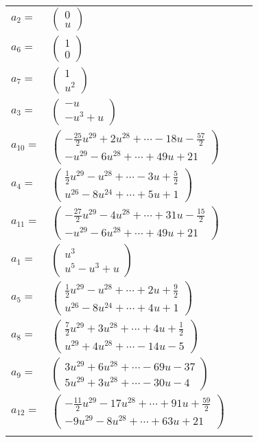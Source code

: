 \documentclass[1p]{elsarticle_modified}
\theoremstyle{definition}
\begin{document}
\begin{tabular}{m{7pt} m{180pt} m{7pt} m{180pt} }
\flushright $a_{2}=$&$\begin{pmatrix}0\\u\end{pmatrix}$ \\
\flushright $a_{6}=$&$\begin{pmatrix}1\\0\end{pmatrix}$ \\
\flushright $a_{7}=$&$\begin{pmatrix}1\\u^2\end{pmatrix}$ \\
\flushright $a_{3}=$&$\begin{pmatrix}- u\\- u^3+u\end{pmatrix}$ \\
\flushright $a_{10}=$&$\begin{pmatrix}-\frac{25}{2} u^{29}+2 u^{28}+\cdots-18 u-\frac{57}{2}\\- u^{29}-6 u^{28}+\cdots+49 u+21\end{pmatrix}$ \\
\flushright $a_{4}=$&$\begin{pmatrix}\frac{1}{2} u^{29}- u^{28}+\cdots-3 u+\frac{5}{2}\\u^{26}-8 u^{24}+\cdots+5 u+1\end{pmatrix}$ \\
\flushright $a_{11}=$&$\begin{pmatrix}-\frac{27}{2} u^{29}-4 u^{28}+\cdots+31 u-\frac{15}{2}\\- u^{29}-6 u^{28}+\cdots+49 u+21\end{pmatrix}$ \\
\flushright $a_{1}=$&$\begin{pmatrix}u^3\\u^5- u^3+u\end{pmatrix}$ \\
\flushright $a_{5}=$&$\begin{pmatrix}\frac{1}{2} u^{29}- u^{28}+\cdots+2 u+\frac{9}{2}\\u^{26}-8 u^{24}+\cdots+4 u+1\end{pmatrix}$ \\
\flushright $a_{8}=$&$\begin{pmatrix}\frac{7}{2} u^{29}+3 u^{28}+\cdots+4 u+\frac{1}{2}\\u^{29}+4 u^{28}+\cdots-14 u-5\end{pmatrix}$ \\
\flushright $a_{9}=$&$\begin{pmatrix}3 u^{29}+6 u^{28}+\cdots-69 u-37\\5 u^{29}+3 u^{28}+\cdots-30 u-4\end{pmatrix}$ \\
\flushright $a_{12}=$&$\begin{pmatrix}-\frac{11}{2} u^{29}-17 u^{28}+\cdots+91 u+\frac{59}{2}\\-9 u^{29}-8 u^{28}+\cdots+63 u+21\end{pmatrix}$\\&\end{tabular}
\end{document}
